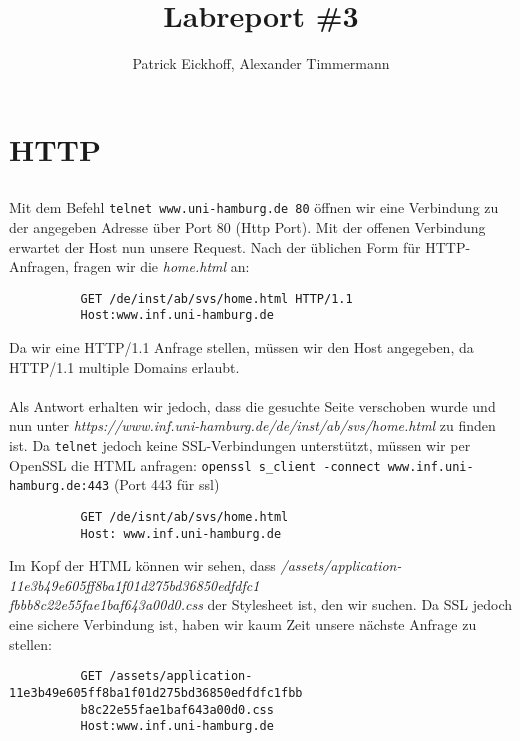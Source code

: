 \documentclass{scrartcl}
\author{Patrick Eickhoff, Alexander Timmermann}
\title{Labreport \#3}
\date{}
\begin{document}
    \maketitle
    \section{HTTP}
    \label{sec:HTTP}

      \subsection{}
      \label{sub:1.1}
        Mit dem Befehl \texttt{telnet www.uni-hamburg.de 80} öffnen wir eine
        Verbindung zu der angegeben Adresse über Port 80 (Http Port).
        Mit der offenen Verbindung erwartet der Host nun unsere Request.
        Nach der üblichen Form für HTTP-Anfragen, fragen wir die
        \textit{home.html} an:
        \begin{lstlisting}
          GET /de/inst/ab/svs/home.html HTTP/1.1
          Host:www.inf.uni-hamburg.de
        \end{lstlisting}
        Da wir eine HTTP/1.1 Anfrage stellen, müssen wir den Host angegeben,
        da HTTP/1.1 multiple Domains erlaubt.\\\\
        Als Antwort erhalten wir jedoch, dass die gesuchte Seite verschoben
        wurde und nun unter
        \textit{https://www.inf.uni-hamburg.de/de/inst/ab/svs/home.html}
        zu finden ist. Da \texttt{telnet} jedoch keine SSL-Verbindungen
        unterstützt, müssen wir per OpenSSL die HTML anfragen:
        \texttt{openssl s\_client -connect www.inf.uni-hamburg.de:443} (Port 443
        für ssl)
        \begin{lstlisting}
          GET /de/isnt/ab/svs/home.html
          Host: www.inf.uni-hamburg.de
        \end{lstlisting}
        Im Kopf der HTML können wir sehen, dass
        \textit{/assets/application-11e3b49e605ff8ba1f01d275bd36850edfdfc1\\
                fbbb8c22e55fae1baf643a00d0.css}
        der Stylesheet ist, den wir suchen. Da SSL jedoch eine sichere Verbindung
        ist, haben wir kaum Zeit unsere nächste Anfrage zu stellen:
        \begin{lstlisting}
          GET /assets/application-11e3b49e605ff8ba1f01d275bd36850edfdfc1fbb
          b8c22e55fae1baf643a00d0.css
          Host:www.inf.uni-hamburg.de
        \end{lstlisting}
\end{document}
